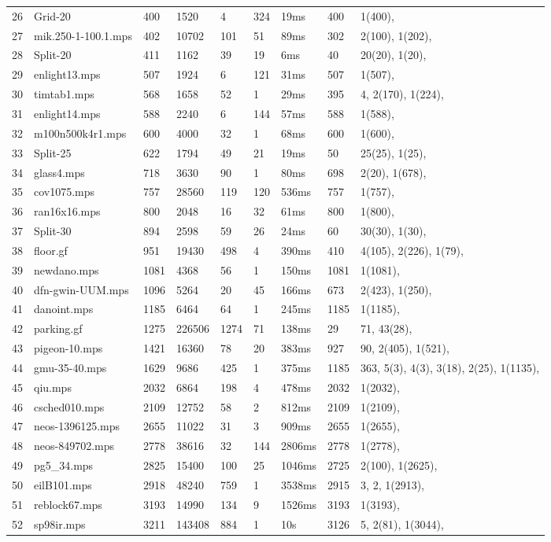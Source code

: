 \documentclass{article}
\begin{document}
\begin{longtable}{|l |l |l |l |l |l |l |l |l |}
26&Grid-20&400&1520&4&324&19ms&400&1(400), \\
27&mik.250-1-100.1.mps&402&10702&101&51&89ms&302&2(100), 1(202), \\
28&Split-20&411&1162&39&19&6ms&40&20(20), 1(20), \\
29&enlight13.mps&507&1924&6&121&31ms&507&1(507), \\
30&timtab1.mps&568&1658&52&1&29ms&395&4, 2(170), 1(224), \\
31&enlight14.mps&588&2240&6&144&57ms&588&1(588), \\
32&m100n500k4r1.mps&600&4000&32&1&68ms&600&1(600), \\
33&Split-25&622&1794&49&21&19ms&50&25(25), 1(25), \\
34&glass4.mps&718&3630&90&1&80ms&698&2(20), 1(678), \\
35&cov1075.mps&757&28560&119&120&536ms&757&1(757), \\
36&ran16x16.mps&800&2048&16&32&61ms&800&1(800), \\
37&Split-30&894&2598&59&26&24ms&60&30(30), 1(30), \\
38&floor.gf&951&19430&498&4&390ms&410&4(105), 2(226), 1(79), \\
39&newdano.mps&1081&4368&56&1&150ms&1081&1(1081), \\
40&dfn-gwin-UUM.mps&1096&5264&20&45&166ms&673&2(423), 1(250), \\
41&danoint.mps&1185&6464&64&1&245ms&1185&1(1185), \\
42&parking.gf&1275&226506&1274&71&138ms&29&71, 43(28), \\
43&pigeon-10.mps&1421&16360&78&20&383ms&927&90, 2(405), 1(521), \\
44&gmu-35-40.mps&1629&9686&425&1&375ms&1185&363, 5(3), 4(3), 3(18), 2(25), 1(1135), \\
45&qiu.mps&2032&6864&198&4&478ms&2032&1(2032), \\
46&csched010.mps&2109&12752&58&2&812ms&2109&1(2109), \\
47&neos-1396125.mps&2655&11022&31&3&909ms&2655&1(2655), \\
48&neos-849702.mps&2778&38616&32&144&2806ms&2778&1(2778), \\
49&pg5_34.mps&2825&15400&100&25&1046ms&2725&2(100), 1(2625), \\
50&eilB101.mps&2918&48240&759&1&3538ms&2915&3, 2, 1(2913), \\
51&reblock67.mps&3193&14990&134&9&1526ms&3193&1(3193), \\
52&sp98ir.mps&3211&143408&884&1&10s&3126&5, 2(81), 1(3044), \\

\end{longtable}
\end{document}
